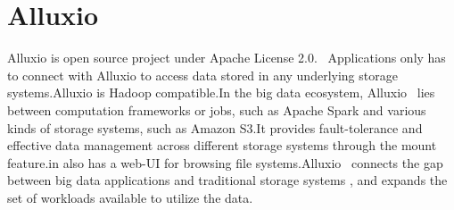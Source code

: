 \section{Alluxio}
Alluxio is open source project under Apache License 2.0.~\cite{alluxio} Applications only has to connect with Alluxio to access data stored in any underlying storage systems.Alluxio is Hadoop compatible.In the big data ecosystem, Alluxio~\cite{alluxio} lies between computation frameworks or jobs, such as Apache Spark and various kinds of storage systems, such as Amazon S3.It provides fault-tolerance and effective data management across different storage systems through the mount feature.in also has a web-UI for browsing file systems.Alluxio~\cite{alluxio} connects the gap between big data applications and traditional storage systems , and expands the set of workloads available to utilize the data. 
